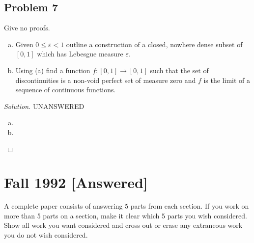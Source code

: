 \documentclass[12pt]{article}
\newcommand{\eps}{\varepsilon}
\theoremstyle{definition}
\begin{document}
\subsection{Problem 7 \texorpdfstring{\cite{SS}}{}}
Give no proofs.
\begin{enumerate}[(a)]
    \item Given $0 \leq \eps < 1$ outline a construction of a closed, nowhere dense subset of $[0,1]$ which has Lebesgue measure $\eps$.
    \item Using (a) find a function $f : [0,1] \to [0,1]$ such that the set of discontinuities is a non-void perfect set of measure zero and $f$ is the limit of a sequence of continuous functions.
\end{enumerate}
\begin{proof}[Solution]
    \noindent UNANSWERED
    \begin{enumerate}[(a)]
        \item 
        \item 
    \end{enumerate}
\end{proof}
\newpage
\section{Fall 1992 [Answered]}
A complete paper consists of answering 5 parts from each section. If you work on more than 5 parts on a section, make it clear which 5 parts you wish considered. Show all work you want considered and cross out or erase any extraneous work you do not wish considered.
\end{document}
